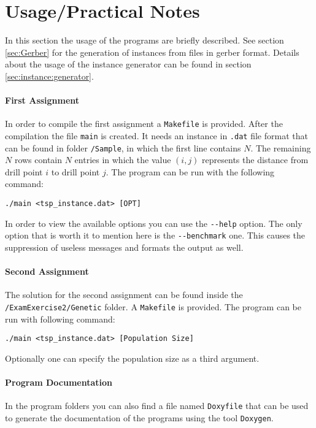\section{Usage/Practical Notes}
In this section the usage of the programs are briefly described.
See section \ref{sec:Gerber} for the generation of instances from files in gerber format.
Details about the usage of the instance generator can be found in section \ref{sec:instance:generator}.
\paragraph{First Assignment}
In order to compile the first assignment a \verb|Makefile| is provided.
After the compilation the file \verb|main| is created. It needs an instance
in \verb|.dat| file format that can be found in folder \verb|/Sample|, in which the first line contains $N$.
The remaining $N$ rows contain $N$ entries in which the value $(i, j)$ represents the distance
from drill point $i$ to drill point $j$.
The program can be run with the following command:
\begin{verbatim}
./main <tsp_instance.dat> [OPT]
\end{verbatim}
In order to view the available options you can use the \verb|--help|  option.
The only option that is worth it to mention here is the \verb|--benchmark| one.
This causes the suppression of useless messages and formats the output as well.

\paragraph{Second Assignment}
The solution for the second assignment can be found inside the \verb|/ExamExercise2/Genetic| folder. 
A \verb|Makefile| is provided. The program can be run with following command:
\begin{verbatim}
./main <tsp_instance.dat> [Population Size]
\end{verbatim}
Optionally one can specify the population size as a third argument.
\paragraph{Program Documentation}
In the program folders you can also find a file named \verb|Doxyfile| that can be used to generate the documentation of the programs using the tool \verb|Doxygen|.
